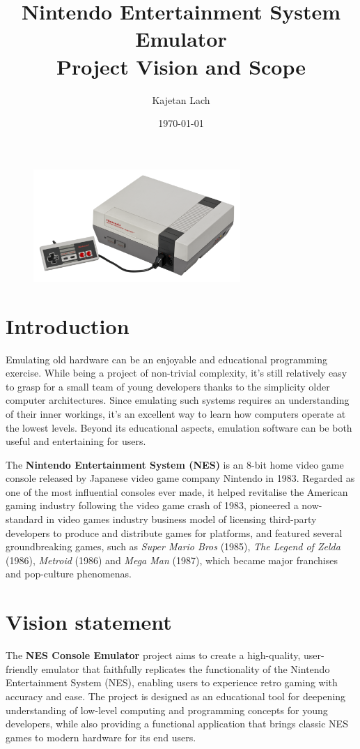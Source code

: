 \documentclass{article}
\title{%
\vspace{-2.5cm}
\textbf{Nintendo Entertainment System Emulator}\\
Project Vision and Scope
}
\date{\today}
\author{Kajetan Lach}
\begin{document}
\maketitle

\begin{figure}[h]
    \centering
    \includegraphics[width=0.7\textwidth]{NES.png}
\end{figure}

\section{Introduction}
Emulating old hardware can be an enjoyable and educational programming exercise. While being a project of non-trivial complexity, it's still relatively easy to grasp for a small team of young developers thanks to the simplicity older computer architectures. Since emulating such systems requires an understanding of their inner workings, it's an excellent way to learn how computers operate at the lowest levels. Beyond its educational aspects, emulation software can be both useful and entertaining for users.

The \textbf{Nintendo Entertainment System (NES)} is an 8-bit home video game console released by Japanese video game company Nintendo in 1983. Regarded as one of the most influential consoles ever made, it helped revitalise the American gaming industry following the video game crash of 1983, pioneered a now-standard in video games industry business model of licensing third-party developers to produce and distribute games for platforms, and featured several groundbreaking games, such as \textit{Super Mario Bros} (1985), \textit{The Legend of Zelda} (1986), \textit{Metroid} (1986) and \textit{Mega Man} (1987), which became major franchises and pop-culture phenomenas.

\section{Vision statement}
The \textbf{NES Console Emulator} project aims to create a high-quality, user-friendly emulator that faithfully replicates the functionality of the Nintendo Entertainment System (NES), enabling users to experience retro gaming with accuracy and ease. The project is designed as an educational tool for deepening understanding of low-level computing and programming concepts for young developers, while also providing a functional application that brings classic NES games to modern hardware for its end users.
\end{document}

